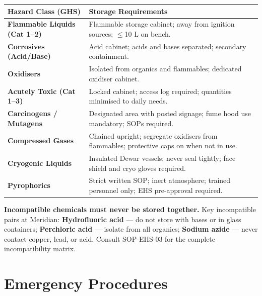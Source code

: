 \documentclass[11pt,a4paper]{article}
\begin{document}
\begin{tabularx}{\linewidth}{@{}>{\bfseries}l >{\raggedright\arraybackslash}X@{}}
  \rowcolor{accent}
  \color{white}Hazard Class (GHS) & \color{white}Storage Requirements \\
  \midrule
  Flammable Liquids (Cat 1--2)   & Flammable storage cabinet; away from ignition sources; $\leq$10 L on bench. \\
  Corrosives (Acid/Base)         & Acid cabinet; acids and bases separated; secondary containment. \\
  Oxidisers                      & Isolated from organics and flammables; dedicated oxidiser cabinet. \\
  Acutely Toxic (Cat 1--3)       & Locked cabinet; access log required; quantities minimised to daily needs. \\
  Carcinogens / Mutagens         & Designated area with posted signage; fume hood use mandatory; SOPs required. \\
  Compressed Gases               & Chained upright; segregate oxidisers from flammables; protective caps on when not in use. \\
  Cryogenic Liquids              & Insulated Dewar vessels; never seal tightly; face shield and cryo gloves required. \\
  Pyrophorics                    & Strict written SOP; inert atmosphere; trained personnel only; EHS pre-approval required. \\
\end{tabularx}

\smallskip
\begin{dangerbox}
  \textbf{Incompatible chemicals must never be stored together.} Key incompatible pairs at
  Meridian: \textbf{Hydrofluoric acid} --- do not store with bases or in glass containers;
  \textbf{Perchloric acid} --- isolate from all organics; \textbf{Sodium azide} --- never contact
  copper, lead, or acid. Consult SOP-EHS-03 for the complete incompatibility matrix.
\end{dangerbox}

\section{Emergency Procedures}
\end{document}
